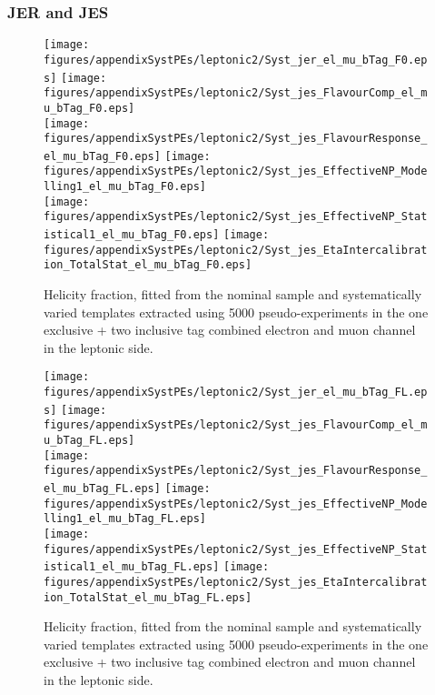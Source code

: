 \clearpage
\subsubsection{JER and JES}
\begin{figure}[!hb]
\begin{center}
        \texttt{[image: figures/appendixSystPEs/leptonic2/Syst\_jer\_el\_mu\_bTag\_F0.eps]}
        \texttt{[image: figures/appendixSystPEs/leptonic2/Syst\_jes\_FlavourComp\_el\_mu\_bTag\_F0.eps]}\\
        \texttt{[image: figures/appendixSystPEs/leptonic2/Syst\_jes\_FlavourResponse\_el\_mu\_bTag\_F0.eps]}
        \texttt{[image: figures/appendixSystPEs/leptonic2/Syst\_jes\_EffectiveNP\_Modelling1\_el\_mu\_bTag\_F0.eps]}\\
        \texttt{[image: figures/appendixSystPEs/leptonic2/Syst\_jes\_EffectiveNP\_Statistical1\_el\_mu\_bTag\_F0.eps]}
        \texttt{[image: figures/appendixSystPEs/leptonic2/Syst\_jes\_EtaIntercalibration\_TotalStat\_el\_mu\_bTag\_F0.eps]}
\caption{Helicity fraction, \fo fitted from the nominal \ttbar sample and systematically varied templates extracted using 5000 pseudo-experiments in the one exclusive + two inclusive \bt tag combined electron and muon channel in the leptonic side. }
\label{fig:systematicVar_lep_f0_elmu2incl_JERJES_1}
\end{center}
\end{figure}


\begin{figure}[!hb]
\begin{center}
        \texttt{[image: figures/appendixSystPEs/leptonic2/Syst\_jer\_el\_mu\_bTag\_FL.eps]}
        \texttt{[image: figures/appendixSystPEs/leptonic2/Syst\_jes\_FlavourComp\_el\_mu\_bTag\_FL.eps]}\\
        \texttt{[image: figures/appendixSystPEs/leptonic2/Syst\_jes\_FlavourResponse\_el\_mu\_bTag\_FL.eps]}
        \texttt{[image: figures/appendixSystPEs/leptonic2/Syst\_jes\_EffectiveNP\_Modelling1\_el\_mu\_bTag\_FL.eps]}\\
        \texttt{[image: figures/appendixSystPEs/leptonic2/Syst\_jes\_EffectiveNP\_Statistical1\_el\_mu\_bTag\_FL.eps]}
        \texttt{[image: figures/appendixSystPEs/leptonic2/Syst\_jes\_EtaIntercalibration\_TotalStat\_el\_mu\_bTag\_FL.eps]}

\caption{Helicity fraction, \fl fitted from the nominal \ttbar sample and systematically varied templates extracted using 5000 pseudo-experiments in the one exclusive + two inclusive \bt tag combined electron and muon channel in the leptonic side. }
\label{fig:systematicVar_lep_fL_elmu2incl_JERJES_1}
\end{center}
\end{figure}


